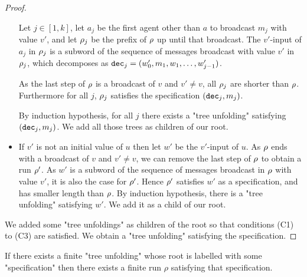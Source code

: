 \begin{proof}
\begin{itemize}
		Let $j \in [1,k]$, let $a_j$ be the first agent other than $a$ to broadcast $m_j$ with value $v'$, and let $\rho_j$ be the prefix of $\rho$ up until that broadcast. The $v'$-input of $a_j$ in $\rho_j$ is a subword of the sequence of messages broadcast with value $v'$ in $\rho_j$, which decomposes as $\mathtt{dec}_j = (w'_0, m_1, w_1, \ldots, w'_{j-1})$.
		
		As the last step of $\rho$ is a broadcast of $v$ and $v' \neq v$, all $\rho_j$ are shorter than $\rho$. Furthermore for all $j$, $\rho_j$ satisfies the specification $(\mathtt{dec}_j, m_j)$.		
		
		By induction hypothesis, for all $j$ there exists a "tree unfolding" satisfying $(\mathtt{dec}_j, m_j)$. We add all those trees as children of our root.
		
		\item If $v'$ is not an initial value of $u$ then let $w'$ be the $v'$-input of $u$. 
		 As $\rho$ ends with a broadcast of $v$ and $v' \neq v$, we can remove the last step of $\rho$ to obtain a run $\rho'$. As $w'$ is a subword of the sequence of messages broadcast in $\rho$ with value $v'$, it is also the case for $\rho'$.
		 Hence $\rho'$ satisfies $w'$ as a specification, and has smaller length than $\rho$. By induction hypothesis, there is a "tree unfolding" satisfying $w'$. We add it as a child of our root.
	\end{itemize}
	
	We added some "tree unfoldings" as children of the root so that conditions (C1) to (C3) are satisfied. We obtain a "tree unfolding" satisfying the specification.
\end{proof}



\begin{lemma}
	If there exists a finite "tree unfolding" whose root is labelled with some "specification" then there exists  a finite run $\rho$ satisfying that specification.
\end{lemma}

